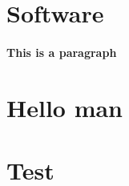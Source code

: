 \documentclass[12pt,letterpaper]{article}
\begin{document}
	\newpage
	
	\section{Software}
	
	\paragraph{This is a paragraph} 
	
	\section*{Hello man}

	\section{Test}
	

	\begin{lstlisting}[language=bash]


	\end{lstlisting}
	
\end{document}

